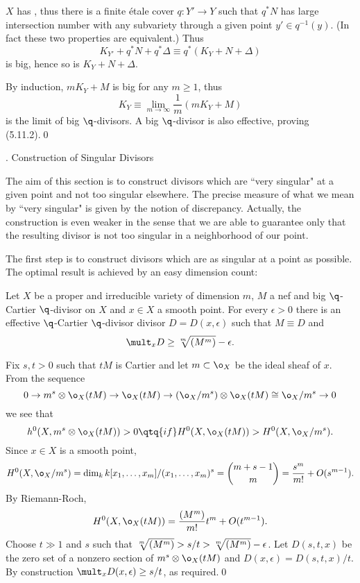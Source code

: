  $X$ has \glafg, thus  there is a finite
\'etale cover
$q:Y'\to Y$ such that $q^*N$ has 
 large intersection number with any
subvariety through a given point $y'\in q^{-1}(y)$. (In fact these
two properties are equivalent.)  Thus
$$
K_{Y'}+q^*N+q^*\Delta\equiv  q^*(K_Y+N+\Delta)
$$
is big, hence so is $K_Y+N+\Delta$. 

By induction, $mK_Y+M$ is big for any $m\geq 1$, thus
$$
K_Y\equiv \lim_{m\to \infty} \frac1{m}(mK_Y+M)
$$
is  the limit of big  $\q$-divisors. A big $\q$-divisor is also effective,
proving (5.11.2).\qed\enddemo






. Construction of Singular Divisors
\endhead


 The aim of this section is to construct divisors
which are ``very singular" at a given point and not too singular elsewhere. The
precise measure of what we mean by ``very singular" is given by the
notion of discrepancy. Actually, the construction is even weaker in the
sense that we are   able to guarantee only that the resulting divisor is 
not too singular in a   neighborhood of our point. 


The first step is to construct divisors which are as singular at a point as
possible. The optimal result is achieved by  an easy dimension count:


 Let $X$ be a proper and irreducible variety of
dimension $m$,
$M$ a nef and big $\q$-Cartier $\q$-divisor on $X$ and $x\in X$ a smooth point.
For every
$\epsilon>0$ there is an effective  $\q$-Cartier  $\q$-divisor divisor
$D=D(x,\epsilon)$ such that
$M\equiv D$ and
$$
\mult_xD\geq \root{m}\of{(M^m)}-\epsilon.
$$
\endproclaim

\demop Fix $s,t>0$ such that $tM$ is Cartier and let $m\subset \o_X$ be the
ideal sheaf of
$x$.  From the sequence
$$
 0\to m^s\otimes \o_X(tM)\to \o_X(tM)\to (\o_X/m^s)\otimes \o_X(tM)\cong
\o_X/m^s\to 0
$$ 
we see that 
$$
 h^0(X,m^s\otimes \o_X(tM))>0\qtq{if} H^0(X,\o_X(tM))>H^0(X,\o_X/m^s).
$$
 Since $x\in X$ is a smooth point, 
$$ H^0(X,\o_X/m^s)=\dim_kk[x_1,\dots,x_m]/(x_1,\dots,x_m)^s=\binom{m+s-1}{m}=
\frac{s^m}{m!}+O(s^{m-1}).
$$
By Riemann-Roch,
$$
 H^0(X,\o_X(tM))=\frac{(M^m)}{m!}t^m+O(t^{m-1}).
$$
 Choose $t\gg 1$ and $s$
such that $\root{m}\of{(M^m)}>s/t>\root{m}\of{(M^m)}-\epsilon$. Let
$D(s,t,x)$ be the zero set of a nonzero section of $m^s\otimes \o_X(tM)$ and
$D(x,\epsilon)=D(s,t,x)/t$. By construction $\mult_xD(x,\epsilon)\geq s/t$, as
required.\qed\enddemo

